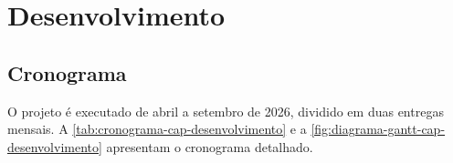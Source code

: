 



\chapter{Desenvolvimento} \label{cap:desenvolvimento}
\section{Cronograma}
 
O projeto é executado de abril a setembro de 2026, dividido em duas entregas
mensais. A \autoref{tab:cronograma-cap-desenvolvimento} e a \autoref{fig:diagrama-gantt-cap-desenvolvimento} apresentam o cronograma detalhado.
 
